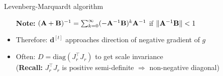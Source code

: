 \documentclass[11pt,compress,t,notes=noshow, xcolor=table]{beamer}
\begin{document}
\begin{vbframe}{Levenberg-Marquardt algorithm}
\begin{itemize}
\begin{framed}
            \textbf{Note:} $(\mathbf{A} + \mathbf{B})^{-1} = \sum_{k=0}^\infty (- \mathbf{A}^{-1} \mathbf{B})^k \mathbf{A}^{-1}$ if $\|\mathbf{A}^{-1} \mathbf{B}\| < 1$
        \end{framed}
    \item Therefore: $\mathbf{d}^{[t]}$ approaches direction of negative gradient of $g$
    \item Often: $D = \text{diag}(J_r^\top J_r)$ to get scale invariance \\[0.1\baselineskip]
        (\textbf{Recall:} $J_r^\top J_r$ is positive semi-definite $\Rightarrow$ non-negative diagonal)
\end{itemize}

\end{vbframe}







\endlecture
\end{document}
